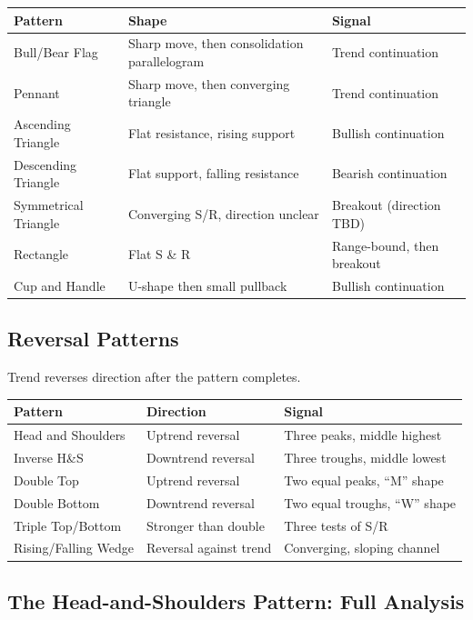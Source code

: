 \documentclass[12pt,a4paper,openany]{report}
\theoremstyle{definition}
\begin{document}
\begin{center}
\begin{tabular}{lll}
\toprule
\textbf{Pattern} & \textbf{Shape} & \textbf{Signal} \\
\midrule
Bull/Bear Flag & Sharp move, then consolidation parallelogram & Trend continuation \\
Pennant & Sharp move, then converging triangle & Trend continuation \\
Ascending Triangle & Flat resistance, rising support & Bullish continuation \\
Descending Triangle & Flat support, falling resistance & Bearish continuation \\
Symmetrical Triangle & Converging S/R, direction unclear & Breakout (direction TBD) \\
Rectangle & Flat S \& R & Range-bound, then breakout \\
Cup and Handle & U-shape then small pullback & Bullish continuation \\
\bottomrule
\end{tabular}
\end{center}

\subsection{Reversal Patterns}
Trend reverses direction after the pattern completes.

\begin{center}
\begin{tabular}{lll}
\toprule
\textbf{Pattern} & \textbf{Direction} & \textbf{Signal} \\
\midrule
Head and Shoulders & Uptrend reversal & Three peaks, middle highest \\
Inverse H\&S & Downtrend reversal & Three troughs, middle lowest \\
Double Top & Uptrend reversal & Two equal peaks, ``M'' shape \\
Double Bottom & Downtrend reversal & Two equal troughs, ``W'' shape \\
Triple Top/Bottom & Stronger than double & Three tests of S/R \\
Rising/Falling Wedge & Reversal against trend & Converging, sloping channel \\
\bottomrule
\end{tabular}
\end{center}

\subsection{The Head-and-Shoulders Pattern: Full Analysis}
\end{document}

